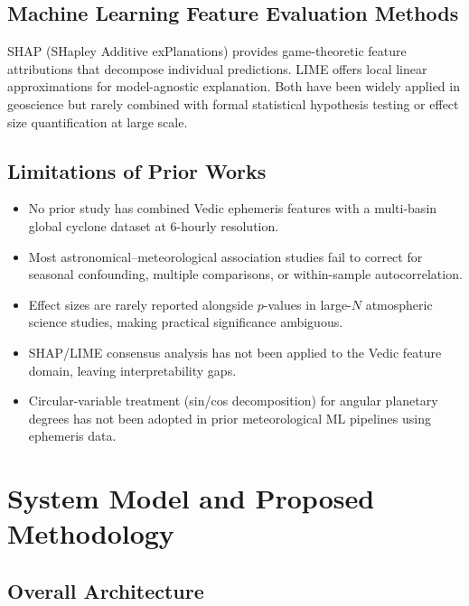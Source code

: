 \documentclass[12pt,a4paper]{article}
\begin{document}
\subsection{Machine Learning Feature Evaluation Methods}

SHAP (SHapley Additive exPlanations) \cite{lundberg2017unified} provides
game-theoretic feature attributions that decompose individual predictions. LIME
\cite{ribeiro2016} offers local linear approximations for model-agnostic
explanation. Both have been widely applied in geoscience but rarely combined
with formal statistical hypothesis testing or effect size quantification at
large scale.

\subsection{Limitations of Prior Works}

\begin{itemize}[noitemsep]
  \item No prior study has combined Vedic ephemeris features with a multi-basin
        global cyclone dataset at 6-hourly resolution.
  \item Most astronomical--meteorological association studies fail to correct
        for seasonal confounding, multiple comparisons, or within-sample
        autocorrelation.
  \item Effect sizes are rarely reported alongside $p$-values in large-$N$
        atmospheric science studies, making practical significance ambiguous.
  \item SHAP/LIME consensus analysis has not been applied to the Vedic feature
        domain, leaving interpretability gaps.
  \item Circular-variable treatment (sin/cos decomposition) for angular
        planetary degrees has not been adopted in prior meteorological ML
        pipelines using ephemeris data.
\end{itemize}

\section{System Model and Proposed Methodology}
\label{sec:methodology}

\subsection{Overall Architecture}
\end{document}
